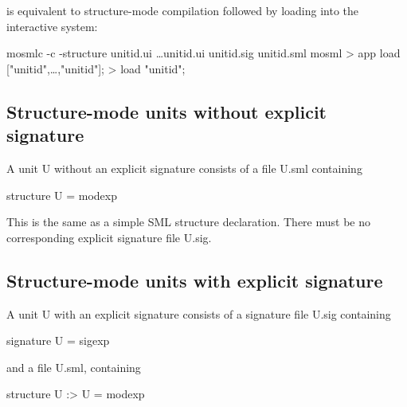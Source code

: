 \documentclass[fleqn,a4paper]{article}
\begin{document}
\noindent is equivalent to structure-mode compilation followed by
loading into the interactive system:

\begin{program}
mosmlc -c -structure unitid\et.ui \ldots unitid\n.ui unitid.sig unitid.sml 
mosml
> app load ["unitid\et",\ldots,"unitid\n"];
> load "unitid";
\end{program}



\subsection{Structure-mode units without explicit signature}
\label{sec-units-without}

A unit U without an explicit signature consists of a file U.sml
containing 

\begin{program}
  structure U = {\rm modexp}
\end{program}


\noindent This is the same as a simple SML structure declaration.
There must be no corresponding explicit signature file U.sig.


\subsection{Structure-mode units with explicit signature}
\label{sec-units-with}

A unit U with an explicit signature consists of a signature file
U.sig containing


\begin{program}
signature U = {\rm sigexp}
\end{program}

\noindent and a file U.sml, containing


\begin{program}
structure U :> U = {\rm modexp} 
\end{program}
\end{document}
